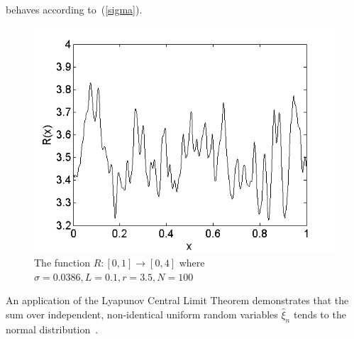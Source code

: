 behaves according to~(\ref{sigma}).
\begin{figure}[!h]
\caption[The function $R(x)$]{The function $R:[0,1]\to [0,4]$ where
  $\sigma=0.0386, L=0.1, r=3.5, N=100$}\label{fig:R}
	\begin{center}
		\includegraphics[scale=0.6]{figs/xi.png}
	\end{center}
\end{figure}

An application of the Lyapunov Central Limit Theorem demonstrates that
the sum over independent, non-identical uniform random variables $\hat{\xi}_n$ tends to the normal distribution~\cite{billingsley}.

